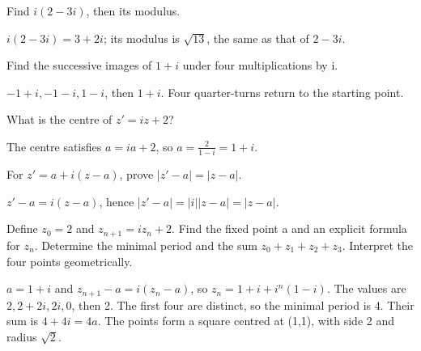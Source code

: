 \documentclass[11pt]{article}
\begin{document}
Find \(i(2-3i)\), then its modulus.\par
\(i(2-3i)=3+2i\); its modulus is \(\sqrt{13}\), the same as that of \(2-3i\).\par
{}
Find the successive images of \(1+i\) under four multiplications by i.\par
−\(1+i, -1-i, 1-i\), then \(1+i\). Four quarter-turns return to the starting point.\par
{}
What is the centre of \(z'=i z+2\)?\par
The centre satisfies \(a=i a+2\), so \(a=\frac{2}{1-i}=1+i\).\par
{}
For \(z'=a+i(z-a)\), prove |\(z'-a|=|z-a|\).\par
\(z'-a=i(z-a)\), hence |\(z'-a|=|i||z-a|=|z-a|\).\par
{}
Define \(z_{0}=2\) and \(z_{n+1}=i z_{n}+2\). Find the fixed point a and an explicit formula for \(z_{n}\). Determine the minimal period and the sum \(z_{0}+z_{1}+z_{2}+z_{3}\). Interpret the four points geometrically.\par
\(a=1+i\) and \(z_{n+1}-a=i(z_{n}-a)\), so \(z_{n}=1+i+i^{n}(1-i)\). The values are \(2, 2+2i, 2i, 0\), then 2. The first four are distinct, so the minimal period is 4. Their sum is \(4+4i=4a\). The points form a square centred at (1,1), with side 2 and radius \(\sqrt{2}\).\par
\end{document}
